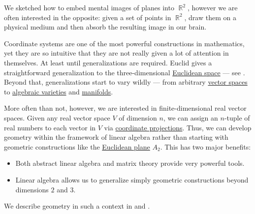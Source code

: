 \begin{remark}\label{rem:coordinate_systems}
  We sketched how to embed mental images of planes into \( \BbbR^2 \), however we are often interested in the opposite: given a set of points in \( \BbbR^2 \), draw them on a physical medium and then absorb the resulting image in our brain.

  Coordinate systems are one of the most powerful constructions in mathematics, yet they are so intuitive that they are not really given a lot of attention in themselves. At least until generalizations are required. Euclid gives a straightforward generalization to the three-dimensional \hyperref[def:euclidean_space]{Euclidean space} --- see \cite{Fitzpatrick2008}. Beyond that, generalizations start to vary wildly --- from arbitrary \hyperref[def:vector_space]{vector spaces} to \hyperref[def:affine_algebraic_set]{algebraic varieties} and \hyperref[def:topological_manifold]{manifolds}.

  More often than not, however, we are interested in finite-dimensional real vector spaces. Given any real vector space \( V \) of dimension \( n \), we can assign an \( n \)-tuple of real numbers to each vector in \( V \) via \hyperref[def:basis_decomposition]{coordinate projections}. Thus, we can develop geometry within the framework of linear algebra rather than starting with geometric constructions like the \hyperref[def:euclidean_plane]{Euclidean plane} \( A_2 \). This has two major benefits:
  \begin{itemize}
    \item Both abstract linear algebra and matrix theory provide very powerful tools.
    \item Linear algebra allows us to generalize simply geometric constructions beyond dimensions \( 2 \) and \( 3 \).
  \end{itemize}

  We describe geometry in such a context in  and .
\end{remark}
